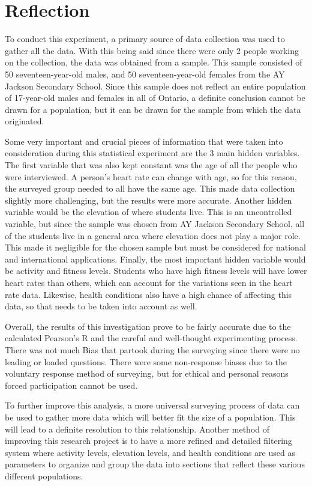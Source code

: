 \section{Reflection}
To conduct this experiment, a primary source of data collection was used to gather all the data. With this being said since there were only 2 people working on the collection, the data was obtained from a sample. This sample consisted of 50 seventeen-year-old males, and 50 seventeen-year-old females from the AY Jackson Secondary School. Since this sample does not reflect an entire population of 17-year-old males and females in all of Ontario, a definite conclusion cannot be drawn for a population, but it can be drawn for the sample from which the data originated.
\vspace{0.3cm}

Some very important and crucial pieces of information that were taken into consideration during this statistical experiment are the 3 main hidden variables. The first variable that was also kept constant was the age of all the people who were interviewed. A person's heart rate can change with age, so for this reason, the surveyed group needed to all have the same age. This made data collection slightly more challenging, but the results were more accurate. Another hidden variable would be the elevation of where students live. This is an uncontrolled variable, but since the sample was chosen from AY Jackson Secondary School, all of the students live in a general area where elevation does not play a major role. This made it negligible for the chosen sample but must be considered for national and international applications. Finally, the most important hidden variable would be activity and fitness levels. Students who have high fitness levels will have lower heart rates than others, which can account for the variations seen in the heart rate data. Likewise, health conditions also have a high chance of affecting this data, so that needs to be taken into account as well. 
\vspace{0.3cm}

Overall, the results of this investigation prove to be fairly accurate due to the calculated Pearson's R and the careful and well-thought experimenting process. There was not much Bias that partook during the surveying since there were no leading or loaded questions. There were some non-response biases due to the voluntary response method of surveying, but for ethical and personal reasons forced participation cannot be used. 
\vspace{0.3cm}

To further improve this analysis, a more universal surveying process of data can be used to gather more data which will better fit the size of a population. This will lead to a definite resolution to this relationship. Another method of improving this research project is to have a more refined and detailed filtering system where activity levels, elevation levels, and health conditions are used as parameters to organize and group the data into sections that reflect these various different populations.